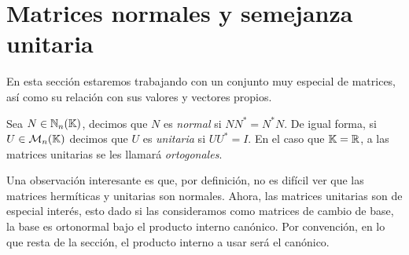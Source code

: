 \section{Matrices normales y semejanza unitaria}

En esta sección estaremos trabajando con un conjunto muy especial de matrices, así como su relación con sus valores y vectores propios. 

\begin{defi}
  Sea $N \in \mathbb{N}_n(\mathbb{K})$, decimos que $N$ es \emph{normal} si $NN^* = N^*N$. De igual forma, si $U\in\mathcal{M}_n(\mathbb{K})$ decimos que $U$ es \emph{unitaria} si $UU^* = I$. En el caso que $\mathbb{K} = \mathbb{R}$, a las matrices unitarias se les llamará \emph{ortogonales}.
\end{defi}

Una observación interesante es que, por definición, no es difícil ver que las matrices hermíticas y unitarias son normales. Ahora, las matrices unitarias son de especial interés, esto dado si las consideramos como matrices de cambio de base, la base es ortonormal bajo el producto interno canónico. Por convención, en lo que resta de la sección, el producto interno a usar será el canónico.


